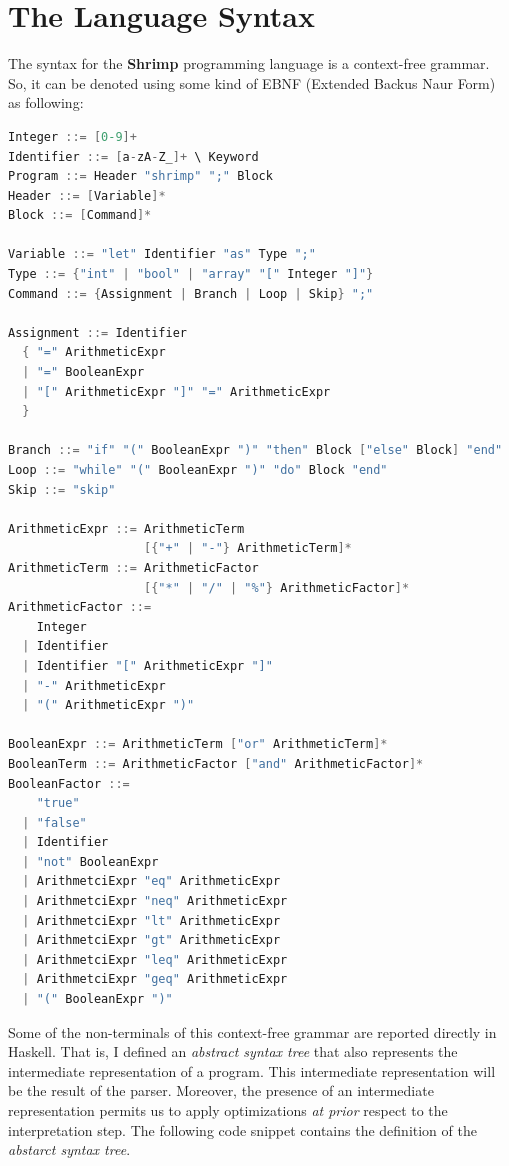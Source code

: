 \documentclass[12pt,a4paper]{article}
\begin{document}
\section*{The Language Syntax}
The syntax for the \textbf{Shrimp} programming language is a context-free grammar.
So, it can be denoted using some kind of EBNF (Extended Backus Naur Form) as following:
\begin{lstlisting}[language=C, style=custom-style]
Integer ::= [0-9]+
Identifier ::= [a-zA-Z_]+ \ Keyword
Program ::= Header "shrimp" ";" Block
Header ::= [Variable]*
Block ::= [Command]*

Variable ::= "let" Identifier "as" Type ";"
Type ::= {"int" | "bool" | "array" "[" Integer "]"}
Command ::= {Assignment | Branch | Loop | Skip} ";"

Assignment ::= Identifier
  { "=" ArithmeticExpr
  | "=" BooleanExpr
  | "[" ArithmeticExpr "]" "=" ArithmeticExpr
  }

Branch ::= "if" "(" BooleanExpr ")" "then" Block ["else" Block] "end"
Loop ::= "while" "(" BooleanExpr ")" "do" Block "end"
Skip ::= "skip"

ArithmeticExpr ::= ArithmeticTerm
                   [{"+" | "-"} ArithmeticTerm]*
ArithmeticTerm ::= ArithmeticFactor
                   [{"*" | "/" | "%"} ArithmeticFactor]*
ArithmeticFactor ::=
    Integer
  | Identifier
  | Identifier "[" ArithmeticExpr "]"
  | "-" ArithmeticExpr
  | "(" ArithmeticExpr ")"

BooleanExpr ::= ArithmeticTerm ["or" ArithmeticTerm]*
BooleanTerm ::= ArithmeticFactor ["and" ArithmeticFactor]*
BooleanFactor ::=
    "true"
  | "false"
  | Identifier
  | "not" BooleanExpr
  | ArithmetciExpr "eq" ArithmeticExpr
  | ArithmetciExpr "neq" ArithmeticExpr
  | ArithmetciExpr "lt" ArithmeticExpr
  | ArithmetciExpr "gt" ArithmeticExpr
  | ArithmetciExpr "leq" ArithmeticExpr
  | ArithmetciExpr "geq" ArithmeticExpr
  | "(" BooleanExpr ")"
\end{lstlisting}
Some of the non-terminals of this context-free grammar are reported directly in Haskell.
That is, I defined an \textit{abstract syntax tree} that also represents the intermediate representation of a program.
This intermediate representation will be the result of the parser.
Moreover, the presence of an intermediate representation permits us to apply optimizations \textit{at prior} respect to the interpretation step.
The following code snippet contains the definition of the \textit{abstarct syntax tree}.
\end{document}
